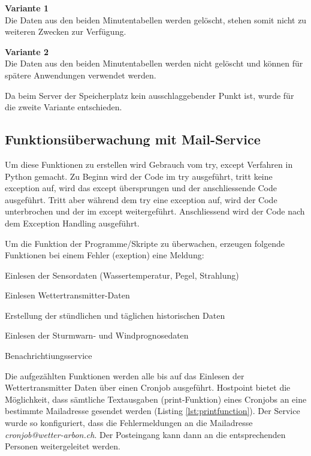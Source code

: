 \begin{itemize*}
\item \textbf{Variante 1}\\
Die Daten aus den beiden Minutentabellen werden gelöscht, stehen somit nicht zu weiteren Zwecken zur Verfügung.
\item \textbf{Variante 2}\\
Die Daten aus den beiden Minutentabellen werden nicht gelöscht und können für spätere Anwendungen verwendet werden.
\end{itemize*}

Da beim Server der Speicherplatz kein ausschlaggebender Punkt ist, wurde für die zweite Variante entschieden.



\subsection{Funktionsüberwachung mit Mail-Service}\label{kap:Funktionsüberwachung}
Um diese Funktionen zu erstellen wird Gebrauch vom try, except Verfahren in Python gemacht. Zu Beginn wird der Code im try ausgeführt, tritt keine exception auf, wird das except übersprungen und der anschliessende Code ausgeführt. Tritt aber während dem try eine exception auf, wird der Code unterbrochen und der im except weitergeführt. Anschliessend wird der Code nach dem Exception Handling ausgeführt.\cite{ThePythonTutorial8.ErrorsAndExceptions:Python}

Um die Funktion der Programme/Skripte zu überwachen, erzeugen folgende Funktionen bei einem Fehler (exeption) eine Meldung:

\begin{itemize*}
\item Einlesen der Sensordaten (Wassertemperatur, Pegel, Strahlung)
\item Einlesen Wettertransmitter-Daten
\item Erstellung der stündlichen und täglichen historischen Daten
\item Einlesen der Sturmwarn- und Windprognosedaten
\item Benachrichtiungsservice
\end{itemize*}

Die aufgezählten Funktionen werden alle bis auf das Einlesen der Wettertransmitter Daten über einen Cronjob ausgeführt. Hostpoint bietet die Möglichkeit, dass sämtliche Textausgaben (print-Funktion) eines Cronjobs an eine bestimmte Mailadresse gesendet werden (Listing \ref{lst:printfunction}). Der Service wurde so konfiguriert, dass die Fehlermeldungen an die Mailadresse \emph{cronjob@wetter-arbon.ch}. Der Posteingang kann dann an die entsprechenden Personen weitergeleitet werden.

